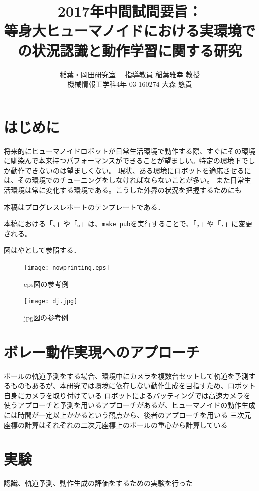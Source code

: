 \documentclass[twocolumn]{preport}
\title{2017年中間試問要旨：\\
等身大ヒューマノイドにおける実環境での状況認識と動作学習に関する研究}
\author{稲葉・岡田研究室 　指導教員 稲葉雅幸 教授\\
  機械情報工学科4年 03-160274 大森 悠貴 }
\begin{document}
\pagestyle{empty}
\maketitle
\thispagestyle{empty}
\sloppy

\section{はじめに}
将来的にヒューマノイドロボットが日常生活環境で動作する際、すぐにその環境に馴染んで本来持つパフォーマンスができることが望ましい。特定の環境下でしか動作できないのは望ましくない。
現状、ある環境にロボットを適応させるには、その環境でのチューニングをしなければならないことが多い。
また日常生活環境は常に変化する環境である。こうした外界の状況を把握するためにも


本稿はプログレスレポートのテンプレートである\cite{Sakai}．

本稿における「、」や「。」は、\verb|make pub|を実行することで、「，」や「．」に変更される。

図はやとして参照する．

\begin{figure}[tbh]
 \begin{center}
  \begin{minipage}{0.3\columnwidth}
   \texttt{[image: nowprinting.eps]}
   \caption{eps図の参考例}
  \end{minipage}
  \hspace{0.15\columnwidth}
  \begin{minipage}{0.3\columnwidth}
   \texttt{[image: dj.jpg]}
   \caption{jpg図の参考例}
  \end{minipage}
  \label{figure:nowprinting}
 \end{center}
\end{figure}

\section{ボレー動作実現へのアプローチ}
ボールの軌道予測をする場合、環境中にカメラを複数台セットして軌道を予測するものもあるが、本研究では環境に依存しない動作生成を目指すため、ロボット自身にカメラを取り付けている
ロボットによるバッティングでは高速カメラを使うアプローチ\cite{Ishikawa}と予測を用いるアプローチがあるが、ヒューマノイドの動作生成には時間が一定以上かかるという観点から、後者のアプローチを用いる
三次元座標の計算はそれぞれの二次元座標上のボールの重心から計算している

\section{実験}
認識、軌道予測、動作生成の評価をするための実験を行った
\end{document}
